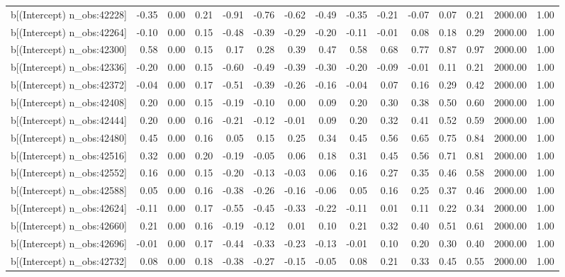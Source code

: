 \begin{table}[ht]
\begin{tabular}{rrrrrrrrrrrrrrr}
  b[(Intercept) n\_obs:42228] & -0.35 & 0.00 & 0.21 & -0.91 & -0.76 & -0.62 & -0.49 & -0.35 & -0.21 & -0.07 & 0.07 & 0.21 & 2000.00 & 1.00 \\ 
  b[(Intercept) n\_obs:42264] & -0.10 & 0.00 & 0.15 & -0.48 & -0.39 & -0.29 & -0.20 & -0.11 & -0.01 & 0.08 & 0.18 & 0.29 & 2000.00 & 1.00 \\ 
  b[(Intercept) n\_obs:42300] & 0.58 & 0.00 & 0.15 & 0.17 & 0.28 & 0.39 & 0.47 & 0.58 & 0.68 & 0.77 & 0.87 & 0.97 & 2000.00 & 1.00 \\ 
  b[(Intercept) n\_obs:42336] & -0.20 & 0.00 & 0.15 & -0.60 & -0.49 & -0.39 & -0.30 & -0.20 & -0.09 & -0.01 & 0.11 & 0.21 & 2000.00 & 1.00 \\ 
  b[(Intercept) n\_obs:42372] & -0.04 & 0.00 & 0.17 & -0.51 & -0.39 & -0.26 & -0.16 & -0.04 & 0.07 & 0.16 & 0.29 & 0.42 & 2000.00 & 1.00 \\ 
  b[(Intercept) n\_obs:42408] & 0.20 & 0.00 & 0.15 & -0.19 & -0.10 & 0.00 & 0.09 & 0.20 & 0.30 & 0.38 & 0.50 & 0.60 & 2000.00 & 1.00 \\ 
  b[(Intercept) n\_obs:42444] & 0.20 & 0.00 & 0.16 & -0.21 & -0.12 & -0.01 & 0.09 & 0.20 & 0.32 & 0.41 & 0.52 & 0.59 & 2000.00 & 1.00 \\ 
  b[(Intercept) n\_obs:42480] & 0.45 & 0.00 & 0.16 & 0.05 & 0.15 & 0.25 & 0.34 & 0.45 & 0.56 & 0.65 & 0.75 & 0.84 & 2000.00 & 1.00 \\ 
  b[(Intercept) n\_obs:42516] & 0.32 & 0.00 & 0.20 & -0.19 & -0.05 & 0.06 & 0.18 & 0.31 & 0.45 & 0.56 & 0.71 & 0.81 & 2000.00 & 1.00 \\ 
  b[(Intercept) n\_obs:42552] & 0.16 & 0.00 & 0.15 & -0.20 & -0.13 & -0.03 & 0.06 & 0.16 & 0.27 & 0.35 & 0.46 & 0.58 & 2000.00 & 1.00 \\ 
  b[(Intercept) n\_obs:42588] & 0.05 & 0.00 & 0.16 & -0.38 & -0.26 & -0.16 & -0.06 & 0.05 & 0.16 & 0.25 & 0.37 & 0.46 & 2000.00 & 1.00 \\ 
  b[(Intercept) n\_obs:42624] & -0.11 & 0.00 & 0.17 & -0.55 & -0.45 & -0.33 & -0.22 & -0.11 & 0.01 & 0.11 & 0.22 & 0.34 & 2000.00 & 1.00 \\ 
  b[(Intercept) n\_obs:42660] & 0.21 & 0.00 & 0.16 & -0.19 & -0.12 & 0.01 & 0.10 & 0.21 & 0.32 & 0.40 & 0.51 & 0.61 & 2000.00 & 1.00 \\ 
  b[(Intercept) n\_obs:42696] & -0.01 & 0.00 & 0.17 & -0.44 & -0.33 & -0.23 & -0.13 & -0.01 & 0.10 & 0.20 & 0.30 & 0.40 & 2000.00 & 1.00 \\ 
  b[(Intercept) n\_obs:42732] & 0.08 & 0.00 & 0.18 & -0.38 & -0.27 & -0.15 & -0.05 & 0.08 & 0.21 & 0.33 & 0.45 & 0.55 & 2000.00 & 1.00 \\ 

\end{tabular}
\end{table}
